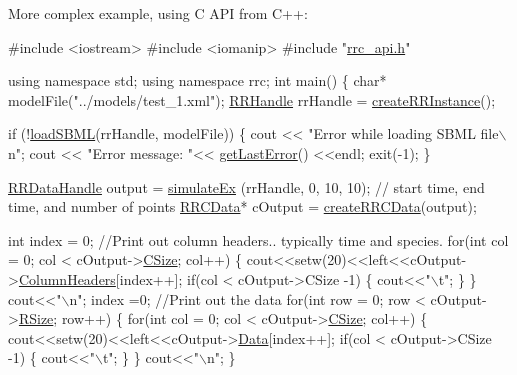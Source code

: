 More complex example, using C A\-P\-I from C++\-: 
\begin{DoxyCode}
\textcolor{preprocessor}{#include <iostream>}
\textcolor{preprocessor}{#include <iomanip>}
\textcolor{preprocessor}{#include "\hyperlink{rrc__api_8h}{rrc\_api.h}"}

\textcolor{keyword}{using namespace }std;
\textcolor{keyword}{using namespace }rrc;
\textcolor{keywordtype}{int} main()
\{
    \textcolor{keywordtype}{char}* modelFile(\textcolor{stringliteral}{"../models/test\_1.xml"});
    \hyperlink{rrc__types_8h_a1d68f0592372208fa5a5f2799ea4b3ae}{RRHandle} rrHandle = \hyperlink{group__initialization_ga3285113641ecf1dc35c39fceb39b60fc}{createRRInstance}();

    \textcolor{keywordflow}{if} (!\hyperlink{group__loadsave_gaeaaaf4f7855457d6207934149f52f5f9}{loadSBML}(rrHandle, modelFile))
    \{
       cout << \textcolor{stringliteral}{"Error while loading SBML file\(\backslash\)n"};
       cout << \textcolor{stringliteral}{"Error message: "}<< \hyperlink{group__errorfunctions_gaa698640f13467d87966d8b90f0c3944c}{getLastError}() <<endl;
       exit(-1);
    \}

    \hyperlink{rrc__types_8h_ad0beb6fbdd576789fab9cead01d8b9e9}{RRDataHandle} output = \hyperlink{group__simulation_ga320684a3df2f13afdfd2156e242ed0c2}{simulateEx} (rrHandle, 0, 10, 10);  \textcolor{comment}{// start time, end time,
       and number of points}
    \hyperlink{struct_r_r_c_data}{RRCData}* cOutput = \hyperlink{group__helper_routines_gaaf161cfff2d85cc5a08ce4fa40d72760}{createRRCData}(output);

    \textcolor{keywordtype}{int} index = 0;
    \textcolor{comment}{//Print out column headers.. typically time and species.}
    \textcolor{keywordflow}{for}(\textcolor{keywordtype}{int} col = 0; col < cOutput->\hyperlink{struct_r_r_c_data_a17c9a5894aa9cb3789346dcaa9c370bb}{CSize}; col++)
    \{
        cout<<setw(20)<<left<<cOutput->\hyperlink{struct_r_r_c_data_ab339159e5604808f92fe793f4f43da03}{ColumnHeaders}[index++];
        \textcolor{keywordflow}{if}(col < cOutput->CSize -1)
        \{
            cout<<\textcolor{stringliteral}{"\(\backslash\)t"};
        \}
    \}
    cout<<\textcolor{stringliteral}{"\(\backslash\)n"};
    index =0;
    \textcolor{comment}{//Print out the data}
    \textcolor{keywordflow}{for}(\textcolor{keywordtype}{int} row = 0; row < cOutput->\hyperlink{struct_r_r_c_data_a4d8512c879223c0e0d1522dae38e7819}{RSize}; row++)
    \{
        \textcolor{keywordflow}{for}(\textcolor{keywordtype}{int} col = 0; col < cOutput->\hyperlink{struct_r_r_c_data_a17c9a5894aa9cb3789346dcaa9c370bb}{CSize}; col++)
        \{
            cout<<setw(20)<<left<<cOutput->\hyperlink{struct_r_r_c_data_a7c5cbda3aa940f4b0d6e8a1679307dfc}{Data}[index++];
            \textcolor{keywordflow}{if}(col < cOutput->CSize -1)
            \{
                cout<<\textcolor{stringliteral}{"\(\backslash\)t"};
            \}
        \}
        cout<<\textcolor{stringliteral}{"\(\backslash\)n"};
      \}


\end{DoxyCode}
